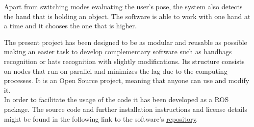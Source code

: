 


Apart from switching modes evaluating the user's pose, the system also detects the hand that is holding an object. 
The software is able to work with one hand at a time and it chooses the one that is higher. 

The present project has been designed to be as modular and reusable as possible making an easier task to develop complementary software such as handbags recognition or hats recognition with slightly modifications. Its structure consists on nodes that run on parallel and minimizes the lag due to the computing processes. It is an Open Source project, meaning that anyone can use and modify it.
\\

In order to facilitate the usage of the code it has been developed as a ROS \cite{ros} package. The source code and further installation instructions and license details might be found in the following link to the software's \href{http://github.com/irenesanznieto/ocular}{\color{blue}\underline {repository}}. 
